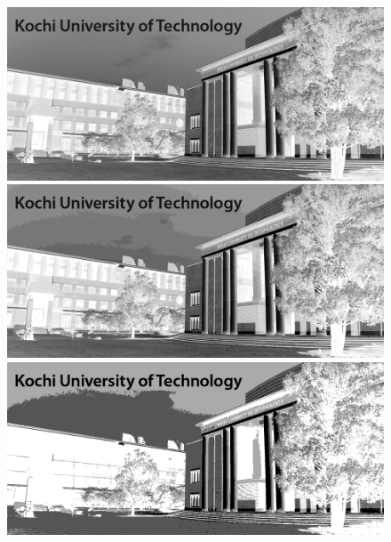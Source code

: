 \begin{figure}[H]
    \centering
    \begin{minipage}[b]{.23\textwidth}
        \centering
        \includegraphics[keepaspectratio,width=\textwidth]{../../Figures/05_31_8.png}
    \end{minipage}
    \begin{minipage}[b]{.23\textwidth}
        \centering
        \includegraphics[keepaspectratio,width=\textwidth]{../../Figures/05_32_4.png}
    \end{minipage}
    \begin{minipage}[b]{.23\textwidth}
        \centering
        \includegraphics[keepaspectratio,width=\textwidth]{../../Figures/05_33_2.png}

\end{minipage}
\end{figure}
